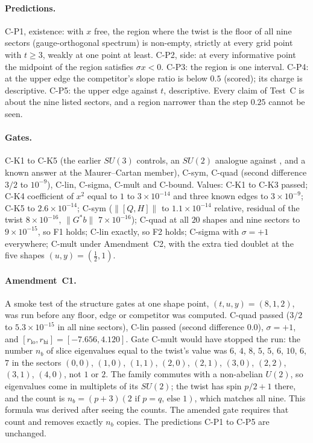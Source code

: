 \documentclass[11pt]{article}
\theoremstyle{definition}
\theoremstyle{remark}
\newcommand{\norm}[1]{\lVert #1\rVert}
\begin{document}
\paragraph{Predictions.} C-P1, existence: with $x$ free, the region where the twist is the floor of all nine sectors
(gauge-orthogonal spectrum) is non-empty, strictly at every grid point with $t\ge3$, weakly at one point at least.
C-P2, side: at every informative point the midpoint of the region satisfies $\sigma x<0$. C-P3: the region is one
interval. C-P4: at the upper edge the competitor's slope ratio is below $0.5$ (scored); its charge is descriptive.
C-P5: the upper edge against $t$, descriptive. Every claim of Test~C is about the nine listed sectors, and a region
narrower than the step $0.25$ cannot be seen.

\paragraph{Gates.} C-K1 to C-K5 (the earlier $SU(3)$ controls, an $SU(2)$ analogue against , and a
known answer at the Maurer--Cartan member), C-sym, C-quad (second difference $3/2$ to $10^{-9}$), C-lin, C-sigma, C-mult
and C-bound. Values: C-K1 to C-K3 passed; C-K4 coefficient of $x^2$ equal to $1$ to $3\times10^{-14}$ and three known
edges to $3\times10^{-9}$; C-K5 to $2.6\times10^{-14}$; C-sym ($\norm{[Q,H]}$ to $1.1\times10^{-14}$ relative, residual of
the twist $8\times10^{-16}$, $\norm{G^*b}$ $7\times10^{-16}$); C-quad at all $20$ shapes and nine sectors to
$9\times10^{-15}$, so F1 holds; C-lin exactly, so F2 holds; C-sigma with $\sigma=+1$ everywhere; C-mult under
Amendment~C2, with the extra tied doublet at the five shapes $(u,y)=(\tfrac12,1)$.

\paragraph{Amendment~C1.} A smoke test of the structure gates at one shape point, $(t,u,y)=(8,1,2)$, was run before any
floor, edge or competitor was computed. C-quad passed ($3/2$ to $5.3\times10^{-15}$ in all nine sectors), C-lin passed
(second difference $0.0$), $\sigma=+1$, and $[r_{\mathrm{lo}},r_{\mathrm{hi}}]=[-7.656,4.120]$. Gate C-mult would have
stopped the run: the number $n_b$ of slice eigenvalues equal to the twist's value was $6$, $4$, $8$, $5$, $5$, $6$, $10$,
$6$, $7$ in the sectors $(0,0)$, $(1,0)$, $(1,1)$, $(2,0)$, $(2,1)$, $(3,0)$, $(2,2)$, $(3,1)$, $(4,0)$, not $1$ or $2$. The
family commutes with a non-abelian $U(2)$, so eigenvalues come in multiplets of its $SU(2)$; the twist has spin $p/2+1$
there, and the count is $n_b=(p+3)(2\text{ if }p=q\text{, else }1)$, which matches all nine. This formula was derived
after seeing the counts. The amended gate requires that count and removes exactly $n_b$ copies. The predictions C-P1 to
C-P5 are unchanged.
\end{document}
